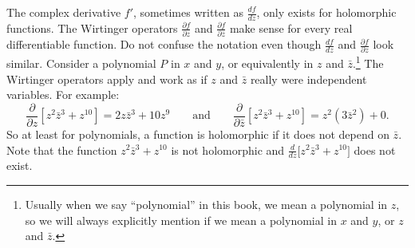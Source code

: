 \documentclass[12pt,openany]{book}
\newcommand{\myquote}[1]{``#1''}
\theoremstyle{plain}
\theoremstyle{remark}
\theoremstyle{definition}
\theoremstyle{exercise}
\theoremstyle{example}
\begin{document}
The complex derivative $f'$, sometimes written as $\frac{df}{dz}$,
only exists for holomorphic functions.
The Wirtinger operators
$\frac{\partial f}{\partial z}$ and
$\frac{\partial f}{\partial \bar{z}}$ make sense for every real differentiable
function.
Do not confuse the notation
even though $\frac{df}{dz}$ and 
$\frac{\partial f}{\partial z}$ look similar.
Consider a polynomial $P$ in $x$ and $y$, or equivalently
in $z$ and $\bar{z}$.\footnote{Usually when we say \myquote{polynomial} in this
book, we mean a polynomial in $z$, so we will always explicitly mention
if we mean a polynomial in $x$ and $y$, or $z$ and $\bar{z}$.}
The Wirtinger operators apply and
work as if $z$ and $\bar{z}$ really were independent variables.  For example:
\begin{equation*}
\frac{\partial}{\partial z}
\left[ z^2 \bar{z}^3 + z^{10} \right]
=
2z \bar{z}^3 + 10 z^{9}
\qquad
\text{and}
\qquad
\frac{\partial}{\partial \bar{z}}
\left[ z^2 \bar{z}^3 + z^{10} \right]
=
z^2 ( 3 \bar{z}^2 ) + 0 .
\end{equation*}
So at least for polynomials, a function is holomorphic 
if it does not depend on $\bar{z}$.
Note that
the function $z^2 \bar{z}^3 + z^{10}$ is not holomorphic
and
$\frac{d}{dz} \bigl[ z^2 \bar{z}^3 + z^{10} \bigr]$
does not exist.
\end{document}
